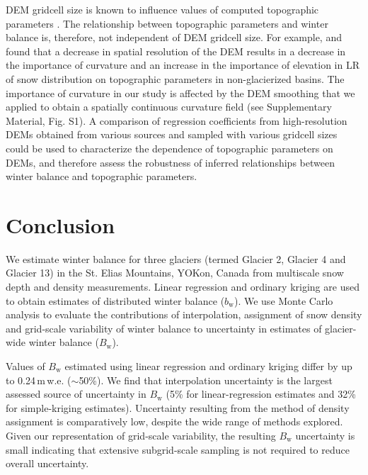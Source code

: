 \documentclass[twocolumn, letterpaper]{igs}
\begin{document}
DEM gridcell size is known to influence values of computed topographic parameters \citep{Zhang1994, Garbrecht1994, Guo-an2001, Lopez2010}. The relationship between topographic parameters and winter balance is, therefore, not independent of DEM gridcell size. For example, \cite{Kienzle2004} and \cite{Lopez2010} found that a decrease in spatial resolution of the DEM results in a decrease in the importance of curvature and an increase in the importance of elevation in LR of snow distribution on topographic parameters in non-glacierized basins. The importance of curvature in our study is affected by the DEM smoothing that we applied to obtain a spatially continuous curvature field (see Supplementary Material, Fig. S1). A comparison of regression coefficients from high-resolution DEMs obtained from various sources and sampled with various gridcell sizes could be used to characterize the dependence of topographic parameters on DEMs, and therefore assess the robustness of inferred relationships between winter balance and topographic parameters. 


\section{Conclusion}

We estimate winter balance for three glaciers (termed Glacier 2, Glacier 4 and Glacier 13) in the St. Elias Mountains, YOKon, Canada from multiscale snow depth and density measurements. Linear regression and ordinary kriging are used to obtain estimates of distributed winter balance ($b_\mathrm{w}$). We use Monte Carlo analysis to evaluate the contributions of interpolation, assignment of snow density and grid-scale variability of winter balance to uncertainty in estimates of glacier-wide winter balance ($B_\mathrm{w}$). 

Values of $B_\mathrm{w}$ estimated using linear regression and ordinary kriging differ by up to 0.24\,m\,w.e. ($\sim$50\%). We find that interpolation uncertainty is the largest assessed source of uncertainty in $B_\mathrm{w}$ (5\% for linear-regression estimates and 32\% for simple-kriging estimates). Uncertainty resulting from the method of density assignment is comparatively low, despite the wide range of methods explored. Given our representation of grid-scale variability, the resulting $B_\mathrm{w}$ uncertainty is small indicating that extensive subgrid-scale sampling is not required to reduce overall uncertainty. 
\end{document}
